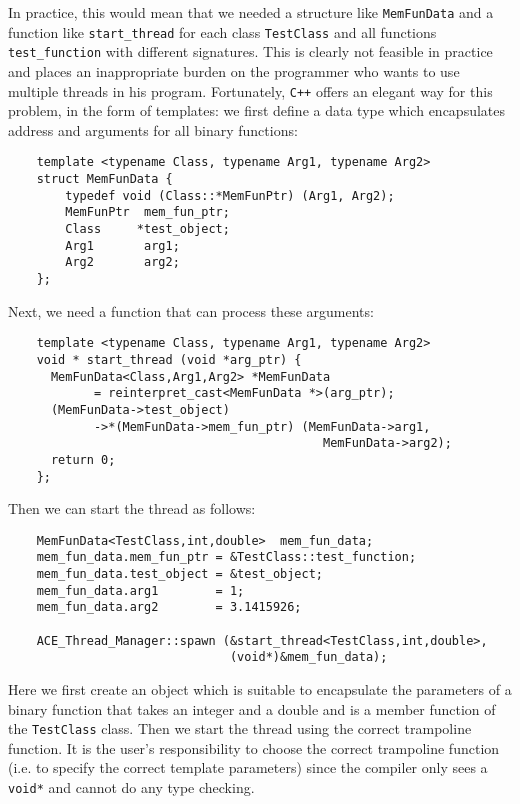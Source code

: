 \documentclass[11pt]{article}
\begin{document}
In practice, this would mean that we needed a structure like
\texttt{MemFunData} and a function like \texttt{start\_thread} for each class
\texttt{TestClass} and all functions \texttt{test\_function} with different
signatures. This is clearly not feasible in practice and places an
inappropriate burden on the programmer who wants to use multiple threads in
his program. Fortunately, \texttt{C++} offers an elegant way for this problem,
in the form of templates: we first define a data type which encapsulates
address and arguments for all binary functions:
\begin{verbatim}
    template <typename Class, typename Arg1, typename Arg2>
    struct MemFunData {
        typedef void (Class::*MemFunPtr) (Arg1, Arg2);
        MemFunPtr  mem_fun_ptr;
        Class     *test_object;
        Arg1       arg1;
        Arg2       arg2;
    };
\end{verbatim}
Next, we need a function that can process these arguments:
\begin{verbatim}
    template <typename Class, typename Arg1, typename Arg2>
    void * start_thread (void *arg_ptr) {
      MemFunData<Class,Arg1,Arg2> *MemFunData
            = reinterpret_cast<MemFunData *>(arg_ptr);
      (MemFunData->test_object)
            ->*(MemFunData->mem_fun_ptr) (MemFunData->arg1,
                                            MemFunData->arg2);
      return 0;
    };
\end{verbatim}
Then we can start the thread as follows:
\begin{verbatim}
    MemFunData<TestClass,int,double>  mem_fun_data;
    mem_fun_data.mem_fun_ptr = &TestClass::test_function;
    mem_fun_data.test_object = &test_object;
    mem_fun_data.arg1        = 1;
    mem_fun_data.arg2        = 3.1415926;
    
    ACE_Thread_Manager::spawn (&start_thread<TestClass,int,double>,
                               (void*)&mem_fun_data);
\end{verbatim}
Here we first create an object which is suitable to encapsulate the parameters
of a binary function that takes an integer and a double and is a member
function of the \texttt{TestClass} class. Then we start the thread using the
correct trampoline function. It is the user's responsibility to choose the
correct trampoline function (i.e. to specify the correct template parameters)
since the compiler only sees a \texttt{void*} and cannot do any type checking.
\end{document}
